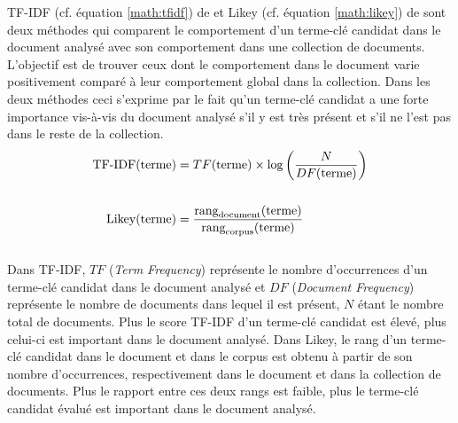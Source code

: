           TF-IDF (cf. équation \ref{math:tfidf}) de \citet{jones1972tfidf} et
          Likey (cf. équation \ref{math:likey}) de \citet{paukkeri2010likey}
          sont deux méthodes qui comparent le comportement d'un terme-clé
          candidat dans le document analysé avec son comportement dans une
          collection de documents. L'objectif est de trouver ceux dont le
          comportement dans le document varie positivement comparé à leur
          comportement global dans la collection. Dans les deux méthodes ceci
          s'exprime par le fait qu'un terme-clé candidat a une forte importance
          vis-à-vis du document analysé s'il y est très présent et s'il ne l'est
          pas dans le reste de la collection.
          \begin{align}
            \text{TF-IDF}(\text{terme}) &= TF(\text{terme}) \times \log\left(\frac{N}{DF(\text{terme})}\right) \label{math:tfidf}\\
            \notag\\
            \text{Likey}(\text{terme}) &= \frac{\text{rang}_{\text{document}}(\text{terme})}{\text{rang}_{\text{corpus}}(\text{terme})} \label{math:likey}
          \end{align}\\
          Dans TF-IDF, $TF$ (\textit{Term Frequency}) représente le nombre
          d'occurrences d'un terme-clé candidat dans le document analysé et $DF$
          (\textit{Document Frequency}) représente le nombre de documents dans
          lequel il est présent, $N$ étant le nombre total de documents. Plus le
          score TF-IDF d'un terme-clé candidat est élevé, plus celui-ci est
          important dans le document analysé. Dans Likey, le rang d'un terme-clé
          candidat dans le document et dans le corpus est obtenu à partir de son
          nombre d'occurrences, respectivement dans le document et dans la
          collection de documents. Plus le rapport entre ces deux rangs est
          faible, plus le terme-clé candidat évalué est important dans le
          document analysé.

